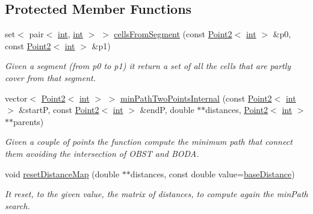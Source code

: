\subsection*{Protected Member Functions}
\begin{DoxyCompactItemize}
\item 
set$<$ pair$<$ \mbox{\hyperlink{draw_8hh_aa620a13339ac3a1177c86edc549fda9b}{int}}, \mbox{\hyperlink{draw_8hh_aa620a13339ac3a1177c86edc549fda9b}{int}} $>$ $>$ \mbox{\hyperlink{class_mapp_a934e0d553769c2735e6193d1b43ddf87}{cells\+From\+Segment}} (const \mbox{\hyperlink{class_point2}{Point2}}$<$ \mbox{\hyperlink{draw_8hh_aa620a13339ac3a1177c86edc549fda9b}{int}} $>$ \&p0, const \mbox{\hyperlink{class_point2}{Point2}}$<$ \mbox{\hyperlink{draw_8hh_aa620a13339ac3a1177c86edc549fda9b}{int}} $>$ \&p1)
\begin{DoxyCompactList}\small\item\em Given a segment (from p0 to p1) it return a set of all the cells that are partly cover from that segment. \end{DoxyCompactList}\item 
vector$<$ \mbox{\hyperlink{class_point2}{Point2}}$<$ \mbox{\hyperlink{draw_8hh_aa620a13339ac3a1177c86edc549fda9b}{int}} $>$ $>$ \mbox{\hyperlink{class_mapp_ae763f86dcfa9c33bda3c58d49419d3e2}{min\+Path\+Two\+Points\+Internal}} (const \mbox{\hyperlink{class_point2}{Point2}}$<$ \mbox{\hyperlink{draw_8hh_aa620a13339ac3a1177c86edc549fda9b}{int}} $>$ \&startP, const \mbox{\hyperlink{class_point2}{Point2}}$<$ \mbox{\hyperlink{draw_8hh_aa620a13339ac3a1177c86edc549fda9b}{int}} $>$ \&endP, double $\ast$$\ast$distances, \mbox{\hyperlink{class_point2}{Point2}}$<$ \mbox{\hyperlink{draw_8hh_aa620a13339ac3a1177c86edc549fda9b}{int}} $>$ $\ast$$\ast$parents)
\begin{DoxyCompactList}\small\item\em Given a couple of points the function compute the minimum path that connect them avoiding the intersection of O\+B\+ST and B\+O\+DA. \end{DoxyCompactList}\item 
void \mbox{\hyperlink{class_mapp_a6dac7b6cd03ed61e93aaa343c51862ea}{reset\+Distance\+Map}} (double $\ast$$\ast$distances, const double value=\mbox{\hyperlink{class_mapp_ae6b2f015604d9f3e34c7702aea081e08}{base\+Distance}})
\begin{DoxyCompactList}\small\item\em It reset, to the given value, the matrix of distances, to compute again the min\+Path search. \end{DoxyCompactList}\end{DoxyCompactItemize}
